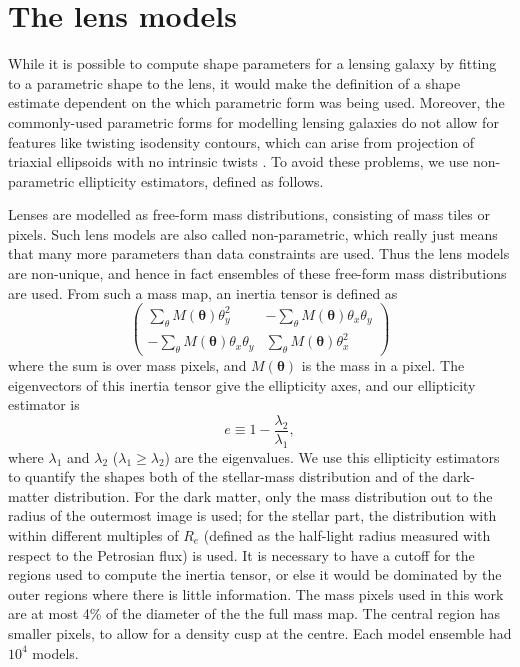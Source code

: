 \documentclass[useAMS,usenatbib]{mn2e}
\begin{document}
\section{The lens models}\label{sec:shapemethod}

While it is possible to compute shape parameters for a lensing galaxy
by fitting to a parametric shape to the lens, it would make the
definition of a shape estimate dependent on the which parametric form
was being used.  Moreover, the commonly-used parametric forms for
modelling lensing galaxies \citep[see e.g.,][]{2001astro.ph..2341K} do
not allow for features like twisting isodensity contours, which can
arise from projection of triaxial ellipsoids with no intrinsic twists
\citep[e.g.][and references therein]{1978ComAp...8...27B}.  To avoid
these problems, we use non-parametric ellipticity estimators, defined
as follows.

Lenses are modelled as free-form mass distributions, consisting of
mass tiles or pixels.  Such lens models are also called
non-parametric, which really just means that many more parameters than
data constraints are used.  Thus the lens models are non-unique, and
hence in fact ensembles of these free-form mass distributions are
used.  From such a mass map, an inertia tensor is defined as
\begin{equation}\label{eq:inertiatensor}
\begin{pmatrix}
 \sum_\theta M(\boldsymbol{\theta})\theta^{2}_{y} & -\sum_\theta M(\boldsymbol{\theta})\theta_{x}\theta_{y} \\
-\sum_\theta M(\boldsymbol{\theta})\theta_{x}\theta_{y} & \sum_\theta M(\boldsymbol{\theta})\theta^{2}_{x}
\end{pmatrix}
\end{equation}
where the sum is over mass pixels, and $M(\boldsymbol{\theta})$ is the
mass in a pixel.  The eigenvectors of this inertia tensor give the
ellipticity axes, and our ellipticity estimator is
\begin{equation}\label{eq:shapeestimate}
    e \equiv 1 - \frac{\lambda_{2}}{\lambda_{1}},
\end{equation}
where $\lambda_{1}$ and $\lambda_{2}$ ($\lambda_{1} \geq \lambda_{2}$)
are the eigenvalues.  We use this ellipticity estimators to quantify
the shapes both of the stellar-mass distribution and of the
dark-matter distribution.  For the dark matter, only the mass
distribution out to the radius of the outermost image is used; for the
stellar part, the distribution with within different multiples of
$R_e$ (defined as the half-light radius measured with respect to the
Petrosian flux) is used.  It is necessary to have a cutoff for the
regions used to compute the inertia tensor, or else it would be
dominated by the outer regions where there is little information.  The
mass pixels used in this work are at most 4\% of the diameter of the
the full mass map.  The central region has smaller pixels, to allow
for a density cusp at the centre.  Each model ensemble had $10^4$
models.
\end{document}

